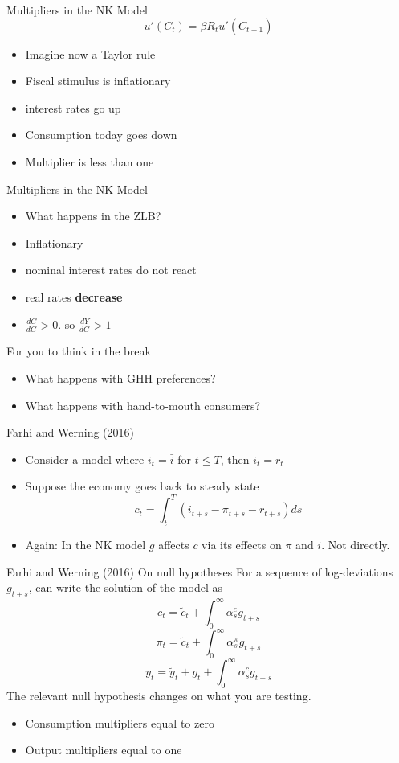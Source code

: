\documentclass[english,xcolor=svgnames]{beamer}
\begin{document}
\begin{frame}{Multipliers in the NK Model}
$$u'(C_t) = \beta R_t u'(C_{t+1})$$
\begin{itemize}
\item Imagine now a Taylor rule
\item Fiscal stimulus is inflationary
\item interest rates go up
\item Consumption today goes down
\item Multiplier is less than one
\end{itemize}
\end{frame}

\begin{frame}{Multipliers in the NK Model}
\begin{itemize}
\item What happens in the ZLB?
\item Inflationary
\item nominal interest rates do not react
\item real rates \textbf{decrease}
\item $\frac{dC}{dG} > 0$. so $\frac{dY}{dG} > 1$
\end{itemize}
\end{frame}

\begin{frame}{For you to think in the break}
\begin{itemize}
\item What happens with GHH preferences?
\item What happens with hand-to-mouth consumers?
\end{itemize}
\end{frame}


\begin{frame}{Farhi and Werning (2016)}
\begin{itemize}
\item Consider a model where $i_t = \bar{i}$ for $t \leq T$, then $i_t = \bar{r}_t$
\item Suppose the economy goes back to steady state
$$c_t = \int_t^T (i_{t+s} - \pi_{t+s} - \bar{r}_{t+s}) ds$$
\item Again: In the NK model $g$ affects $c$ via its effects on $\pi$ and $i$. Not directly.
\end{itemize}
\end{frame}

\begin{frame}{Farhi and Werning (2016) On null hypotheses}
For a sequence of log-deviations $g_{t+s}$, can write the solution of the model as
$$c_t = \tilde{c}_t + \int_0^{\infty}\alpha^c_s g_{t+s}$$
$$\pi_t = \tilde{c}_t + \int_0^{\infty}\alpha^{\pi}_s g_{t+s}$$
$$y_t = \tilde{y}_t + g_t + \int_0^{\infty}\alpha^c_s g_{t+s}$$
The relevant null hypothesis changes on what you are testing.
\begin{itemize}
\item Consumption multipliers equal to zero
\item Output multipliers equal to one
\end{itemize}
\end{frame}
\end{document}
